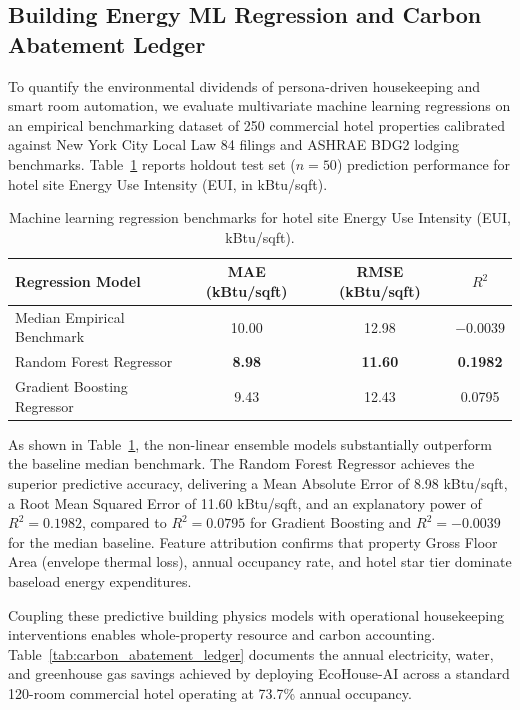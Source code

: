 \documentclass[11pt,a4paper]{article}
\begin{document}
\subsection{Building Energy ML Regression and Carbon Abatement Ledger}
To quantify the environmental dividends of persona-driven housekeeping and smart room automation, we evaluate multivariate machine learning regressions on an empirical benchmarking dataset of 250 commercial hotel properties calibrated against New York City Local Law 84 filings and ASHRAE BDG2 lodging benchmarks. Table~\ref{tab:energy_regression_results} reports holdout test set ($n=50$) prediction performance for hotel site Energy Use Intensity (EUI, in kBtu/sqft).

\begin{table}[H]
\centering
\caption{Machine learning regression benchmarks for hotel site Energy Use Intensity (EUI, kBtu/sqft).}
\label{tab:energy_regression_results}
\begin{tabular}{lccc}
\toprule
\textbf{Regression Model} & \textbf{MAE (kBtu/sqft)} & \textbf{RMSE (kBtu/sqft)} & \textbf{$R^2$} \\
\midrule
Median Empirical Benchmark & 10.00 & 12.98 & $-0.0039$ \\
Random Forest Regressor & \textbf{8.98} & \textbf{11.60} & \textbf{0.1982} \\
Gradient Boosting Regressor & 9.43 & 12.43 & 0.0795 \\
\bottomrule
\end{tabular}
\end{table}

As shown in Table~\ref{tab:energy_regression_results}, the non-linear ensemble models substantially outperform the baseline median benchmark. The Random Forest Regressor achieves the superior predictive accuracy, delivering a Mean Absolute Error of 8.98 kBtu/sqft, a Root Mean Squared Error of 11.60 kBtu/sqft, and an explanatory power of $R^2 = 0.1982$, compared to $R^2 = 0.0795$ for Gradient Boosting and $R^2 = -0.0039$ for the median baseline. Feature attribution confirms that property Gross Floor Area (envelope thermal loss), annual occupancy rate, and hotel star tier dominate baseload energy expenditures.

Coupling these predictive building physics models with operational housekeeping interventions enables whole-property resource and carbon accounting. Table~\ref{tab:carbon_abatement_ledger} documents the annual electricity, water, and greenhouse gas savings achieved by deploying EcoHouse-AI across a standard 120-room commercial hotel operating at 73.7\% annual occupancy.
\end{document}
